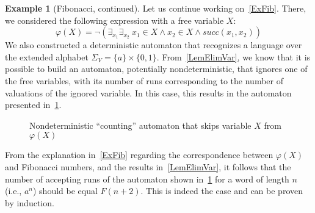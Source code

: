 \documentclass[en]{pracamgr}
\theoremstyle{definition}
\newtheorem{example}{Example}[section]
\begin{document}

\begin{example}[Fibonacci, continued]
\label{ExFibCont}
    Let us continue working on~\cref{ExFib}. There, we considered the following expression with a free variable $X$:
    $$\varphi(X) = \neg(\exists_{x_1}\exists_{x_2} \ x_1 \in X \land x_2 \in X \land succ(x_1, x_2))$$
    We also constructed a deterministic automaton that recognizes a language over the extended alphabet $\Sigma_V = \{a\} \times \{0,1\}$. From~\cref{LemElimVar}, we know that it is possible to build an automaton, potentially nondeterministic, that ignores one of the free variables, with its number of runs corresponding to the number of valuations of the ignored variable. In this case, this results in the automaton presented in~\cref{fig:my_label2}.

    \begin{figure}[ht]
        \centering
        \caption{Nondeterministic ``counting'' automaton that skips variable $X$ from $\varphi(X)$}
        \label{fig:my_label2}
    \end{figure}

    From the explanation in~\cref{ExFib} regarding the correspondence between $\varphi(X)$ and Fibonacci numbers, and the results in~\cref{LemElimVar}, it follows that the number of accepting runs of the automaton shown in~\cref{fig:my_label2} for a word of length $n$ (i.e., $a^n$) should be equal $F(n+2)$. This is indeed the case and can be proven by induction.
\end{example}
\end{document}
